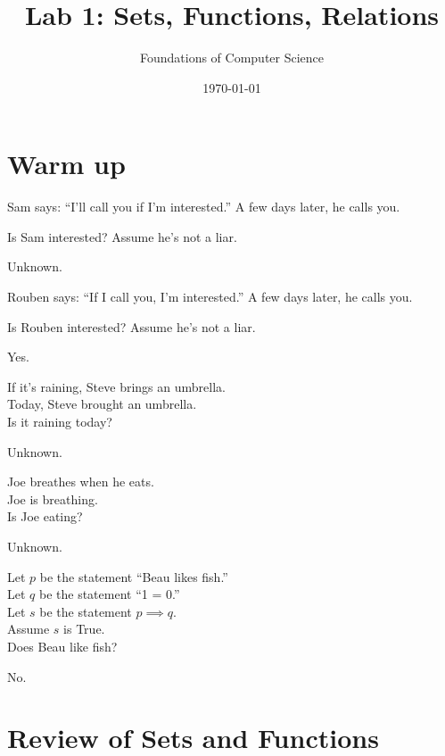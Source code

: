\documentclass[]{exam}
\title{Lab 1: Sets, Functions, Relations}
\author{Foundations of Computer Science}
\date{\today}
\theoremstyle{definition}
\begin{document}
\maketitle

\begin{questions}

\section*{Warm up}
\question
Sam says: ``I'll call you if I'm interested.'' A few days later, he calls you.

Is Sam interested? Assume he's not a liar.

\begin{solution}
Unknown.
\end{solution}

\question
Rouben says: ``If I call you, I'm interested.'' A few days later, he calls you.

Is Rouben interested? Assume he's not a liar.

\begin{solution}
Yes.
\end{solution}


\question If it's raining, Steve brings an umbrella.\\
    Today, Steve brought an umbrella.\\
    Is it raining today?

\begin{solution}
Unknown.
\end{solution}


\question Joe breathes when he eats.\\
    Joe is breathing.\\
    Is Joe eating?
\begin{solution}
Unknown.
\end{solution}


\question Let $p$ be the statement ``Beau likes fish.''\\
    Let $q$ be the statement ``1 = 0.''\\
    Let $s$ be the statement $p \implies q$.\\
    Assume $s$ is True.\\
    Does Beau like fish?
\begin{solution}
No.
\end{solution}


\section*{Review of Sets and Functions}

\end{questions}
\end{document}
